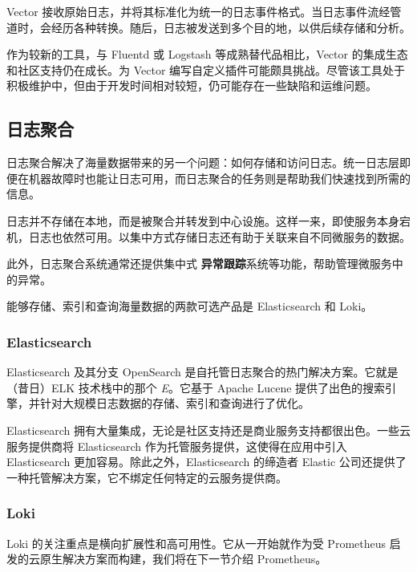 
Vector 接收原始日志，并将其标准化为统一的日志事件格式。当日志事件流经管道时，会经历各种转换。随后，日志被发送到多个目的地，以供后续存储和分析。

\label{idx:1875}
作为较新的工具，与 Fluentd 或 Logstash 等成熟替代品相比，Vector 的集成生态和社区支持仍在成长。为 Vector 编写自定义插件可能颇具挑战。尽管该工具处于积极维护中，但由于开发时间相对较短，仍可能存在一些缺陷和运维问题。

\subsection{日志聚合}

\label{idx:1876}
\label{idx:1877}
日志聚合解决了海量数据带来的另一个问题：如何存储和访问日志。统一日志层即便在机器故障时也能让日志可用，而日志聚合的任务则是帮助我们快速找到所需的信息。

日志并不存储在本地，而是被聚合并转发到中心设施。这样一来，即使服务本身宕机，日志也依然可用。以集中方式存储日志还有助于关联来自不同微服务的数据。

\label{idx:1878}
此外，日志聚合系统通常还提供集中式 \textbf{异常跟踪}系统等功能，帮助管理微服务中的异常。

能够存储、索引和查询海量数据的两款可选产品是 Elasticsearch 和 Loki。

\subsubsection{Elasticsearch}

\label{idx:1879}
Elasticsearch 及其分支 OpenSearch 是自托管日志聚合的热门解决方案。它就是（昔日）ELK 技术栈中的那个 \emph{E}。它基于 Apache Lucene 提供了出色的搜索引擎，并针对大规模日志数据的存储、索引和查询进行了优化。

\label{idx:1880}
Elasticsearch 拥有大量集成，无论是社区支持还是商业服务支持都很出色。一些云服务提供商将 Elasticsearch 作为托管服务提供，这使得在应用中引入 Elasticsearch 更加容易。除此之外，Elasticsearch 的缔造者 Elastic 公司还提供了一种托管解决方案，它不绑定任何特定的云服务提供商。

\subsubsection{Loki}

\label{idx:1881}
Loki 的关注重点是横向扩展性和高可用性。它从一开始就作为受 Prometheus 启发的云原生解决方案而构建，我们将在下一节介绍 Prometheus。

